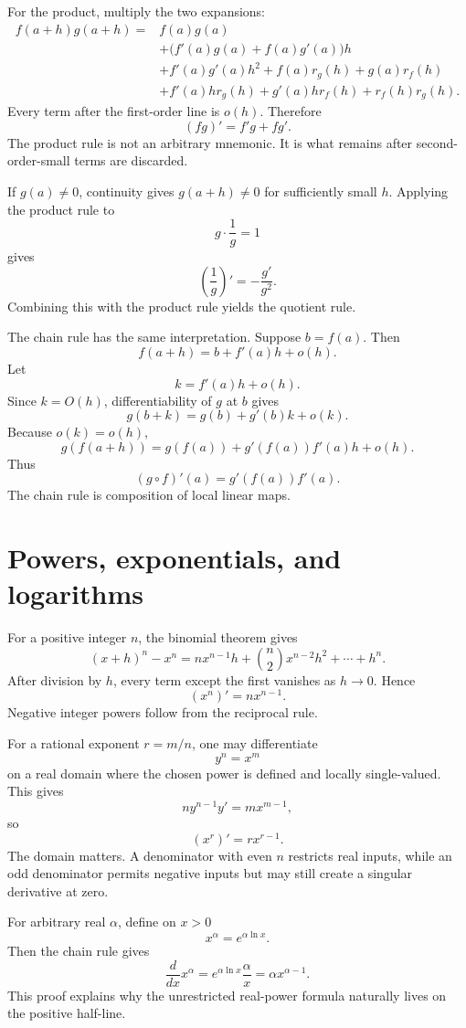 For the product, multiply the two expansions:
\[
\begin{aligned}
  f(a+h)g(a+h)
  ={}&f(a)g(a)\\
  &+\bigl(f'(a)g(a)+f(a)g'(a)\bigr)h\\
  &+f'(a)g'(a)h^2
    +f(a)r_g(h)+g(a)r_f(h)\\
  &+f'(a)h r_g(h)+g'(a)h r_f(h)
    +r_f(h)r_g(h).
\end{aligned}
\]
Every term after the first-order line is \(o(h)\).  Therefore
\[
  \boxed{(fg)'=f'g+fg'.}
\]
The product rule is not an arbitrary mnemonic.  It is what remains after second-order-small terms are discarded.

If \(g(a)\ne0\), continuity gives \(g(a+h)\ne0\) for sufficiently small \(h\).  Applying the product rule to
\[
  g\cdot\frac1g=1
\]
gives
\[
  \left(\frac1g\right)'
  =-\frac{g'}{g^2}.
\]
Combining this with the product rule yields the quotient rule.

The chain rule has the same interpretation.  Suppose \(b=f(a)\).  Then
\[
  f(a+h)=b+f'(a)h+o(h).
\]
Let
\[
  k=f'(a)h+o(h).
\]
Since \(k=O(h)\), differentiability of \(g\) at \(b\) gives
\[
  g(b+k)=g(b)+g'(b)k+o(k).
\]
Because \(o(k)=o(h)\),
\[
  g(f(a+h))
  =g(f(a))+g'(f(a))f'(a)h+o(h).
\]
Thus
\[
  \boxed{(g\circ f)'(a)=g'(f(a))f'(a).}
\]
The chain rule is composition of local linear maps.

\section{Powers, exponentials, and logarithms}

For a positive integer \(n\), the binomial theorem gives
\[
  (x+h)^n-x^n
  =nx^{n-1}h+\binom n2x^{n-2}h^2+\cdots+h^n.
\]
After division by \(h\), every term except the first vanishes as \(h\to0\).  Hence
\[
  (x^n)'=nx^{n-1}.
\]
Negative integer powers follow from the reciprocal rule.

For a rational exponent \(r=m/n\), one may differentiate
\[
  y^n=x^m
\]
on a real domain where the chosen power is defined and locally single-valued.  This gives
\[
  ny^{n-1}y'=mx^{m-1},
\]
so
\[
  (x^r)'=rx^{r-1}.
\]
The domain matters.  A denominator with even \(n\) restricts real inputs, while an odd denominator permits negative inputs but may still create a singular derivative at zero.

For arbitrary real \(\alpha\), define on \(x>0\)
\[
  x^\alpha=e^{\alpha\ln x}.
\]
Then the chain rule gives
\[
  \frac{d}{dx}x^\alpha
  =e^{\alpha\ln x}\frac{\alpha}{x}
  =\alpha x^{\alpha-1}.
\]
This proof explains why the unrestricted real-power formula naturally lives on the positive half-line.

